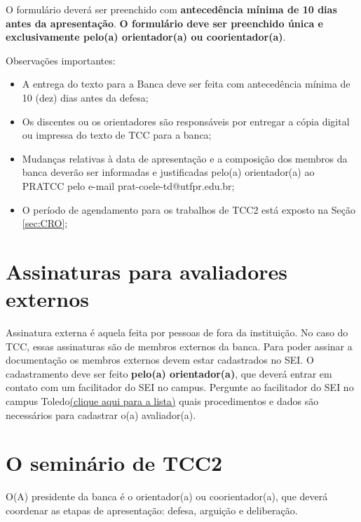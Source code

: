 \documentclass[a4paper, 12pt]{article}
\begin{document}
    O formulário deverá ser preenchido com \textbf{antecedência mínima de 10 dias antes da apresentação}. \textbf{O formulário deve ser preenchido única e exclusivamente pelo(a) orientador(a) ou coorientador(a)}.    
		
    Observações importantes:
    
    \begin{itemize}
    	\item A entrega do texto para a Banca deve ser feita com antecedência mínima de 10 (dez) dias antes da defesa;
    	\item Os discentes ou os orientadores são responsáveis por entregar a cópia digital ou impressa do texto de TCC para a banca;
    	\item Mudanças relativas à data de apresentação e a composição dos membros da banca deverão ser informadas e justificadas pelo(a) orientador(a) ao PRATCC pelo e-mail prat-coele-td@utfpr.edu.br;
    	\item O período de agendamento para os trabalhos de TCC2 está exposto na Seção \ref{sec:CRO};
    \end{itemize}

	\section{Assinaturas para avaliadores externos}
	
	Assinatura externa é aquela feita por pessoas de fora da instituição. No caso do TCC, essas assinaturas são de membros externos da banca. Para poder assinar a documentação os membros externos devem estar cadastrados no SEI. O cadastramento deve ser feito \textbf{pelo(a) orientador(a)}, que deverá entrar em contato com um facilitador do SEI no campus. Pergunte ao facilitador do SEI no campus Toledo\href{http://portal.utfpr.edu.br/servidores/servicos-servidor/sei/facilitadores}{(clique aqui para a lista)} quais procedimentos e dados são necessários para cadastrar o(a) avaliador(a).

	\section{O seminário de TCC2}
	
	O(A) presidente da banca é o orientador(a) ou coorientador(a), que deverá coordenar as etapas de apresentação: defesa, arguição e deliberação. 
	
\end{document}
